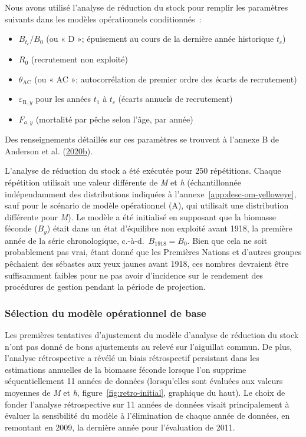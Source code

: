 \documentclass[french,11pt]{book}
\begin{document}
Nous avons utilisé l'analyse de réduction du stock pour remplir les paramètres suivants dans les modèles opérationnels conditionnés~:
\begin{itemize}

\item
  \(B_{t_c}/B_0\) (ou « D »; épuisement au cours de la dernière année historique \(t_c\))
\item
  \(R_0\) (recrutement non exploité)
\item
  \(\theta_\textrm{AC}\) (ou « AC »; autocorrélation de premier ordre des écarts de recrutement)
\item
  \(\varepsilon_{\textrm{R},y}\) pour les années \(t_1\) à \(t_c\) (écarts annuels de recrutement)
\item
  \(F_{a,y}\) (mortalité par pêche selon l'âge, par année)
\end{itemize}
Des renseignements détaillés sur ces paramètres se trouvent à l'annexe B de Anderson et al. (\protect\hyperlink{ref-anderson2020gfmp}{2020}\protect\hyperlink{ref-anderson2020gfmp}{b}).

L'analyse de réduction du stock a été exécutée pour 250 répétitions. Chaque répétition utilisait une valeur différente de \emph{M} et \emph{h} (échantillonnée indépendamment des distributions indiquées à l'annexe~\ref{app:desc-om-yelloweye}, sauf pour le scénario de modèle opérationnel (A), qui utilisait une distribution différente pour \emph{M}). Le modèle a été initialisé en supposant que la biomasse féconde (\(B_y\)) était dans un état d'équilibre non exploité avant 1918, la première année de la série chronologique, c.-à-d.~\(B_{1918} = B_0\). Bien que cela ne soit probablement pas vrai, étant donné que les Premières Nations et d'autres groupes pêchaient des sébastes aux yeux jaunes avant 1918, ces nombres devraient être suffisamment faibles pour ne pas avoir d'incidence sur le rendement des procédures de gestion pendant la période de projection.

\hypertarget{sec:approach3-conditioning-base-om}{%
\subsubsection{Sélection du modèle opérationnel de base}\label{sec:approach3-conditioning-base-om}}

Les premières tentatives d'ajustement du modèle d'analyse de réduction du stock n'ont pas donné de bons ajustements au relevé sur l'aiguillat commun. De plus, l'analyse rétrospective a révélé un biais rétrospectif persistant dans les estimations annuelles de la biomasse féconde lorsque l'on supprime séquentiellement 11 années de données (lorsqu'elles sont évaluées aux valeurs moyennes de \emph{M} et \emph{h}, figure~\ref{fig:retro-initial}, graphique du haut). Le choix de fonder l'analyse rétrospective sur 11 années de données visait principalement à évaluer la sensibilité du modèle à l'élimination de chaque année de données, en remontant en 2009, la dernière année pour l'évaluation de 2011.
\end{document}
